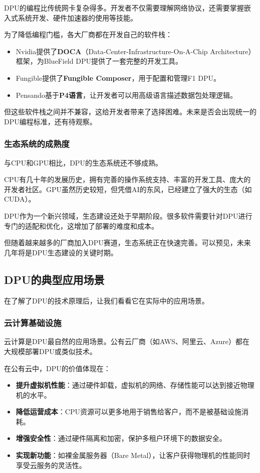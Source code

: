 DPU的编程比传统网卡复杂得多。开发者不仅需要理解网络协议，还需要掌握嵌入式系统开发、硬件加速器的使用等技能。

为了降低编程门槛，各大厂商都在开发自己的软件栈：

\begin{itemize}
    \item Nvidia提供了\textbf{DOCA}（Data-Center-Infrastructure-On-A-Chip Architecture）框架，为BlueField DPU提供了一套完整的开发工具。
    \item Fungible提供了\textbf{Fungible Composer}，用于配置和管理F1 DPU。
    \item Pensando基于\textbf{P4语言}，让开发者可以用高级语言描述数据包处理逻辑。
\end{itemize}

但这些软件栈之间并不兼容，这给开发者带来了选择困难。未来是否会出现统一的DPU编程标准，还有待观察。

\subsubsection{生态系统的成熟度}

与CPU和GPU相比，DPU的生态系统还不够成熟。

CPU有几十年的发展历史，拥有完善的操作系统支持、丰富的开发工具、庞大的开发者社区。GPU虽然历史较短，但凭借AI的东风，已经建立了强大的生态（如CUDA）。

DPU作为一个新兴领域，生态建设还处于早期阶段。很多软件需要针对DPU进行专门的适配和优化，这增加了部署的难度和成本。

但随着越来越多的厂商加入DPU赛道，生态系统正在快速完善。可以预见，未来几年将是DPU生态建设的关键时期。

\subsection{DPU的典型应用场景}

在了解了DPU的技术原理后，让我们看看它在实际中的应用场景。

\subsubsection{云计算基础设施}

云计算是DPU最自然的应用场景。公有云厂商（如AWS、阿里云、Azure）都在大规模部署DPU或类似技术。

在公有云中，DPU的价值体现在：

\begin{itemize}
    \item \textbf{提升虚拟机性能}：通过硬件卸载，虚拟机的网络、存储性能可以达到接近物理机的水平。
    \item \textbf{降低运营成本}：CPU资源可以更多地用于销售给客户，而不是被基础设施消耗。
    \item \textbf{增强安全性}：通过硬件隔离和加密，保护多租户环境下的数据安全。
    \item \textbf{实现新功能}：如裸金属服务器（Bare Metal），让客户获得物理机的性能同时享受云服务的灵活性。
\end{itemize}

